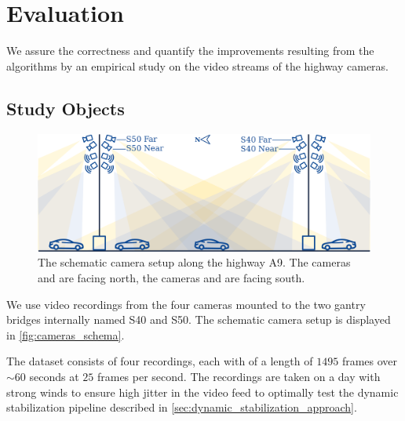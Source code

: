 
\section{Evaluation}

We assure the correctness and quantify the improvements resulting from the algorithms by an empirical study on the video streams of the highway cameras.

\subsection{Study Objects}
\begin{figure}[t]
    \begin{center}
       \includegraphics[width=\linewidth]{images/cameras_schema.png}
    \end{center}
       \caption{The schematic camera setup along the highway A9.
       The cameras  and  are facing north,
       the cameras  and  are facing south.}
    \label{fig:cameras_schema}
    \end{figure}

We use video recordings from the four cameras mounted to the two gantry bridges internally named S40 and S50. The schematic camera setup is displayed in \autoref{fig:cameras_schema}.

The dataset consists of four recordings, each with of a length of $1495$ frames over $\sim 60$ seconds at $25$ frames per second.
The recordings are taken on a day with strong winds to ensure high jitter in the video feed to optimally test the dynamic stabilization pipeline described in \autoref{sec:dynamic_stabilization_approach}. 


